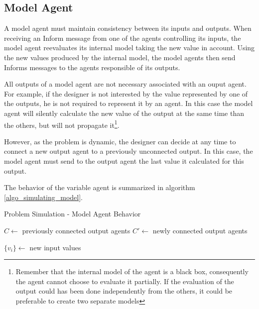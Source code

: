 \subsection{Model Agent}

A model agent must maintain consistency between its inputs and outputs. When receiving an Inform message from one of the agents controlling its inputs, the model agent reevaluates its internal model taking the new value in account. Using the new values produced by the internal model, the model agents then send Informs messages to the agents responsible of its outputs.

All outputs of a model agent are not necessary associated with an ouput agent. For example, if the designer is not interested by the value represented by one of the outputs, he is not required to represent it by an agent. In this case the model agent will silently calculate the new value of the output at the same time than the others, but will not propagate it\footnote{Remember that the internal model of the agent is a black box, consequently the agent cannot choose to evaluate it partially. If the evaluation of the output could has been done independently from the others, it could be preferable to create two separate models}.

However, as the problem is dynamic, the designer can decide at any time to connect a new output agent to a previously unconnected output. In this case, the model agent must send to the output agent the last value it calculated for this output.

The behavior of the variable agent is summarized in algorithm \ref{algo_simulating_model}.

\begin{algorithm}
\caption{Problem Simulation - Model Agent Behavior}
\label{algo_simulating_model}
\begin{algorithmic}
	$C \leftarrow$ previously connected output agents\;
	$C'\leftarrow$  newly connected output agents\;
	
	$\{v_i\} \leftarrow$ new input values\;
			
	
	
\end{algorithmic}
\end{algorithm}

